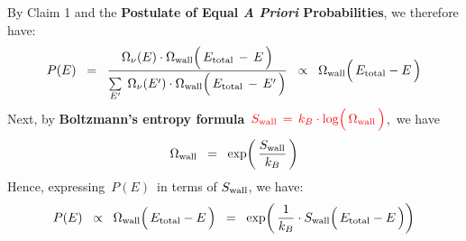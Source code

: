 
\vskip 0.4cm
\noindent
By Claim 1 and the
\textbf{Postulate of Equal \textit{A Priori} Probabilities},
we therefore have:
\begin{equation*}
P(E)
\;\; = \;\;
    \dfrac{
        \Omega_{\nu}(E)
        \cdot
        \Omega_{\textnormal{wall}}\!\left(\,\overset{{\color{white}.}}{
            E_{\textnormal{total}} \,-\, E
            }\,\right)
    }{
        \underset{E^{\prime}}{\sum}\;\,
        \Omega_{\nu}(E^{\prime})
        \cdot
        \Omega_{\textnormal{wall}}\!\left(\,\overset{{\color{white}.}}{
            E_{\textnormal{total}} \,-\, E^{\prime}
            }\,\right)
        }
\;\; \propto \;\;
    \Omega_{\textnormal{wall}}\!\left(\,\overset{{\color{white}.}}{
        E_{\textnormal{total}}-E
        }\,\right)
\end{equation*}
Next, by \textbf{\color{red}Boltzmann's entropy formula}
\,${\color{red}
S_{\textnormal{wall}}
\,=\,
    k_{B} \cdot \log\!\left(\,\overset{{\color{white}.}}{
        \Omega_{\textnormal{wall}}
        }\,\right)
}$,\,
we have
\begin{equation*}
\Omega_{\textnormal{wall}}
\;\; = \;\;
    \exp\!\left(\,
        \dfrac{
            S_{\textnormal{wall}}
            }{
            k_{B}
            }
        \,\right)
\end{equation*}
Hence, expressing \,$P(E)$\, in terms of $S_{\textnormal{wall}}$, we have:
\begin{equation*}
P(E)
\;\; \propto \;\;
    \Omega_{\textnormal{wall}}\!\left(\,\overset{{\color{white}.}}{
        E_{\textnormal{total}}-E
        }\,\right)
\;\; = \;\;
    \exp\!\left(\,
        \dfrac{1}{k_{B}}
        \cdot
        S_{\textnormal{wall}}\!\left(\,\overset{{\color{white}.}}{
            E_{\textnormal{total}}-E
            }\,\right)
        \right)
\end{equation*}
